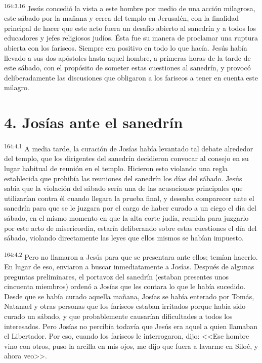 \par 
\textsuperscript{164:3.16} Jesús concedió la vista a este hombre por medio de una acción milagrosa, este sábado por la mañana y cerca del templo en Jerusalén, con la finalidad principal de hacer que este acto fuera un desafío abierto al sanedrín y a todos los educadores y jefes religiosos judíos.
Ésta fue su manera de proclamar una ruptura abierta con los fariseos. Siempre era positivo en todo lo que hacía. Jesús había llevado a sus dos apóstoles hasta aquel hombre, a primeras horas de la tarde de este sábado, con el propósito de someter estas cuestiones al sanedrín, y provocó deliberadamente las discusiones que obligaron a los fariseos a tener en cuenta este milagro.

\section*{4. Josías ante el sanedrín}
\par 
\textsuperscript{164:4.1} A media tarde, la curación de Josías había levantado tal debate alrededor del templo, que los dirigentes del sanedrín decidieron convocar al consejo en su lugar habitual de reunión en el templo. Hicieron esto violando una regla establecida que prohibía las reuniones del sanedrín los días del sábado. Jesús sabía que la violación del sábado sería una de las acusaciones principales que utilizarían contra él cuando llegara la prueba final, y deseaba comparecer ante el sanedrín para que se le juzgara por el cargo de haber curado a un ciego el día del sábado, en el mismo momento en que la alta corte judía, reunida para juzgarlo por este acto de misericordia, estaría deliberando sobre estas cuestiones el día del sábado, violando directamente las leyes que ellos mismos se habían impuesto.

\par 
\textsuperscript{164:4.2} Pero no llamaron a Jesús para que se presentara ante ellos; temían hacerlo. En lugar de eso, enviaron a buscar inmediatamente a Josías. Después de algunas preguntas preliminares, el portavoz del sanedrín (estaban presentes unos cincuenta miembros) ordenó a Josías que les contara lo que le había sucedido. Desde que se había curado aquella mañana, Josías se había enterado por Tomás, Natanael y otras personas que los fariseos estaban irritados porque había sido curado un sábado, y que probablemente causarían dificultades a todos los interesados. Pero Josías no percibía todavía que Jesús era aquel a quien llamaban el Libertador. Por eso, cuando los fariseos le interrogaron, dijo: <<Ese hombre vino con otros, puso la arcilla en mis ojos, me dijo que fuera a lavarme en Siloé, y ahora veo>>.

